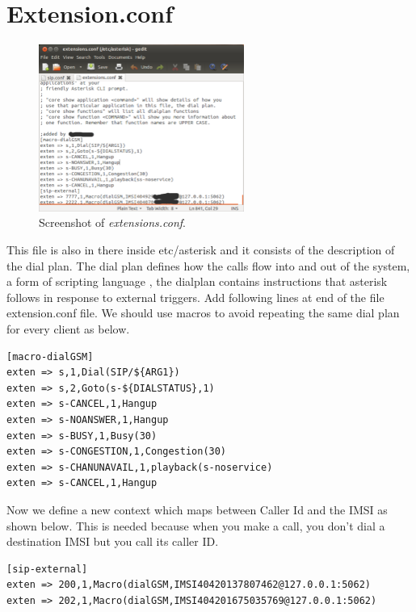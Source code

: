 \section{Extension.conf}

\begin{figure}
  \centering
    \includegraphics[width=0.6\textwidth]{../images/ext_conf}
  \caption[extensions.conf]{Screenshot of \emph{extensions.conf}.}
  \label{ext_conf}
\end{figure}

This file is  also in there inside etc/asterisk and it consists of the
description of the dial plan. The dial plan defines how the calls flow into
and out of the system, a form of scripting language , the dialplan contains
instructions that asterisk follows in response to external triggers. 
Add following lines at end of the file extension.conf file. We should use
macros to avoid repeating the same dial plan for every client as below.


\begin{verbatim}
[macro-dialGSM]
exten => s,1,Dial(SIP/${ARG1})
exten => s,2,Goto(s-${DIALSTATUS},1)
exten => s-CANCEL,1,Hangup
exten => s-NOANSWER,1,Hangup
exten => s-BUSY,1,Busy(30)
exten => s-CONGESTION,1,Congestion(30)
exten => s-CHANUNAVAIL,1,playback(s-noservice)
exten => s-CANCEL,1,Hangup
\end{verbatim}

Now we define a new context which maps between Caller Id and the IMSI as shown
below. This is needed because when you make a call, you don't dial a
destination IMSI but you call its caller ID.

\begin{verbatim}
[sip-external]
exten => 200,1,Macro(dialGSM,IMSI40420137807462@127.0.0.1:5062)
exten => 202,1,Macro(dialGSM,IMSI404201675035769@127.0.0.1:5062)
\end{verbatim}


